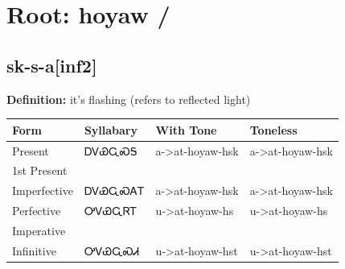 \documentclass{article}%
\begin{document}
%
\normalsize%
\section*{Root: hoyaw / }%
\subsection*{sk-s-a[inf2]}%
\textbf{Definition: }%
it’s flashing (refers to reflected light)%
\\[0.5em]%
\begin{tabular}{|l|l|l|l|}%
\hline%
\textbf{Form}&\textbf{Syllabary}&\textbf{With Tone}&\textbf{Toneless}\\%
\hline%
Present&ᎠᏙᏯᏩᏍᎦ&a{-}>at{-}hoyaw{-}hsk&a{-}>at{-}hoyaw{-}hsk\\%
1st Present&&&\\%
Imperfective&ᎠᏙᏯᏩᏍᎪᎢ&a{-}>at{-}hoyaw{-}hsk&a{-}>at{-}hoyaw{-}hsk\\%
Perfective&ᎤᏙᏯᏩᏒᎢ&u{-}>at{-}hoyaw{-}hs&u{-}>at{-}hoyaw{-}hs\\%
Imperative&&&\\%
Infinitive&ᎤᏙᏯᏩᏍᏗ&u{-}>at{-}hoyaw{-}hst&u{-}>at{-}hoyaw{-}hst\\%
\hline%
\end{tabular}%
\\[1em]%
\end{document}
